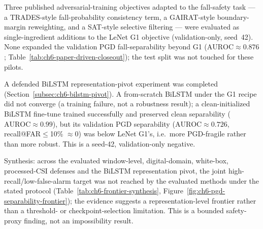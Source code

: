     \item Three published adversarial-training objectives adapted to the fall-safety task --- a TRADES-style
    fall-probability consistency term, a GAIRAT-style boundary-margin reweighting, and a SAT-style selective
    filtering --- were evaluated as single-ingredient additions to the LeNet G1 objective (validation-only,
    seed~42). None expanded the validation PGD fall-separability beyond G1
    (\(\mathrm{AUROC}\approx 0.876\); Table~\ref{tab:ch6-paper-driven-closeout}); the test split was not
    touched for these pilots.
    \item A defended BiLSTM representation-pivot experiment was completed (Section~\ref{subsec:ch6-bilstm-pivot}).
    A from-scratch BiLSTM under the G1 recipe did not converge (a training failure, not a robustness result);
    a clean-initialized BiLSTM fine-tune trained successfully and preserved clean separability
    (\(\mathrm{AUROC}\approx 0.99\)), but its validation PGD separability (\(\mathrm{AUROC}\approx 0.726\),
    recall@FAR\(\leq\)10\% \(\approx 0\)) was below LeNet G1's, i.e.\ more PGD-fragile rather than more
    robust. This is a seed-42, validation-only negative.
    \item Synthesis: across the evaluated window-level, digital-domain, white-box, processed-CSI defenses and
    the BiLSTM representation pivot, the joint high-recall/low-false-alarm target was not reached by the
    evaluated methods under the stated protocol (Table~\ref{tab:ch6-frontier-synthesis},
    Figure~\ref{fig:ch6-pgd-separability-frontier}); the evidence suggests a representation-level frontier
    rather than a threshold- or checkpoint-selection limitation. This is a bounded safety-proxy finding, not
    an impossibility result.


